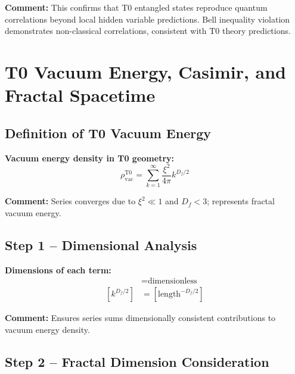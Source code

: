 \documentclass[12pt,a4paper]{article}
\begin{document}
\textbf{Comment:} 
This confirms that T0 entangled states reproduce quantum correlations beyond local hidden variable predictions.  
Bell inequality violation demonstrates non-classical correlations, consistent with T0 theory predictions.

\section{T0 Vacuum Energy, Casimir, and Fractal Spacetime}

\subsection{Definition of T0 Vacuum Energy}

\textbf{Vacuum energy density in T0 geometry:}
\begin{equation}
	\rho_\text{vac}^\text{T0} = \sum_{k=1}^{\infty} \frac{\xi^2}{4\pi} k^{D_f/2}
\end{equation}

\textbf{Comment:} Series converges due to $\xi^2 \ll 1$ and $D_f < 3$; represents fractal vacuum energy.

\subsection{Step 1 – Dimensional Analysis}

\textbf{Dimensions of each term:}
\begin{align}
	[\xi^2 / 4\pi] &= \text{dimensionless} \\
	[k^{D_f/2}] &= [\text{length}^{-D_f/2}]
\end{align}

\textbf{Comment:} Ensures series sums dimensionally consistent contributions to vacuum energy density.

\subsection{Step 2 – Fractal Dimension Consideration}
\end{document}
